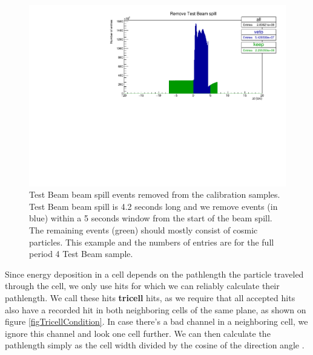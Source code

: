 \documentclass[12pt,a4paper]{article}
\begin{document}
\begin{figure}[hbtp]
\centering
\includegraphics[width=\textwidth]{Plots/RemoveTBSpills.pdf}
\caption{Test Beam beam spill events removed from the calibration samples. Test Beam beam spill is 4.2 seconds long and we remove events (in blue) within a 5 seconds window from the start of the beam spill. The remaining events (green) should mostly consist of cosmic particles. This example and the numbers of entries are for the full period 4 Test Beam sample.}
\label{figRemoveBeamSpill}
\end{figure}

Since energy deposition in a cell depends on the pathlength the particle traveled through the cell, we only use hits for which we can reliably calculate their pathlength. We call these hits \textbf{tricell} hits, as we require that all accepted hits also have a recorded hit in both neighboring cells of the same plane, as shown on figure \ref{figTricellCondition}. In case there's a bad channel in a neighboring cell, we ignore this channel and look one cell further. We can then calculate the pathlength simply as the cell width divided by the cosine of the direction angle \cite{NOVA-doc-13579,NOVA-doc-7410}.
\end{document}
